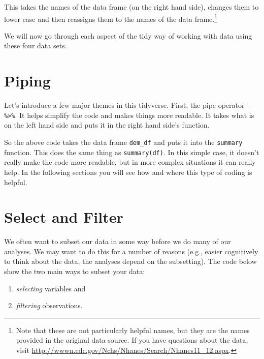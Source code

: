 \documentclass[]{tufte-book}
\newenvironment{Shaded}{}{}
\newcommand{\StringTok}[1]{\textcolor[rgb]{0.25,0.44,0.63}{#1}}
\newcommand{\OperatorTok}[1]{\textcolor[rgb]{0.40,0.40,0.40}{#1}}
\newcommand{\NormalTok}[1]{#1}
\providecommand{\tightlist}{%
  \setlength{\itemsep}{0pt}\setlength{\parskip}{0pt}}
\theoremstyle{definition}
\theoremstyle{definition}
\theoremstyle{remark}
\begin{document}
This takes the names of the data frame (on the right hand side), changes
them to lower case and then reassigns them to the names of the data
frame.\footnote{Note that these are not particularly helpful names, but
  they are the names provided in the original data source. If you have
  questions about the data, visit
  \url{http://wwwn.cdc.gov/Nchs/Nhanes/Search/Nhanes11_12.aspx}.}

We will now go through each aspect of the tidy way of working with data
using these four data sets.

\section*{Piping}\label{piping}

Let's introduce a few major themes in this tidyverse. First, the pipe
operator -- \texttt{\%\textgreater{}\%}. It helps simplify the code and
makes things more readable. It takes what is on the left hand side and
puts it in the right hand side's function.

\begin{Shaded}
\end{Shaded}

So the above code takes the data frame \texttt{dem\_df} and puts it into
the \texttt{summary} function. This does the same thing as
\texttt{summary(df)}. In this simple case, it doesn't really make the
code more readable, but in more complex situations it can really help.
In the following sections you will see how and where this type of coding
is helpful.

\section*{Select and Filter}\label{select-and-filter}

We often want to subset our data in some way before we do many of our
analyses. We may want to do this for a number of reasons (e.g., easier
cognitively to think about the data, the analyses depend on the
subsetting). The code below show the two main ways to subset your data:

\begin{enumerate}
\def\labelenumi{\arabic{enumi}.}
\tightlist
\item
  \emph{selecting} variables and
\item
  \emph{filtering} observations.
\end{enumerate}
\end{document}
